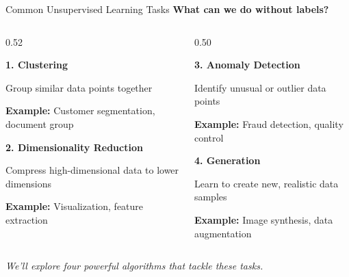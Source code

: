 \begin{frame}{Common Unsupervised Learning Tasks}
\textbf{What can we do without labels?}

\begin{columns}[t]
\begin{column}{0.52\textwidth}
\begin{tcolorbox}[colback=blue!5, colframe=blue!50, height=2.6cm]
\textbf{1. Clustering}

Group similar data points together

\textbf{Example:} Customer segmentation, document group
\end{tcolorbox}

\vspace{0.1em}

\begin{tcolorbox}[colback=red!5, colframe=red!50, height=2.6cm]
\textbf{2. Dimensionality Reduction}

Compress high-dimensional data to lower dimensions

\textbf{Example:} Visualization, feature extraction
\end{tcolorbox}
\end{column}

\begin{column}{0.50\textwidth}
\begin{tcolorbox}[colback=orange!5, colframe=orange!50, height=2.6cm]
\textbf{3. Anomaly Detection}

Identify unusual or outlier data points

\textbf{Example:} Fraud detection, quality control
\end{tcolorbox}

\vspace{0.1em}

\begin{tcolorbox}[colback=purple!5, colframe=purple!50, height=2.6cm]
\textbf{4. Generation}

Learn to create new, realistic data samples

\textbf{Example:} Image synthesis, data augmentation
\end{tcolorbox}
\end{column}
\end{columns}

\vspace{0.1em}
\centering
\small \textit{We'll explore four powerful algorithms that tackle these tasks.}
\end{frame}



